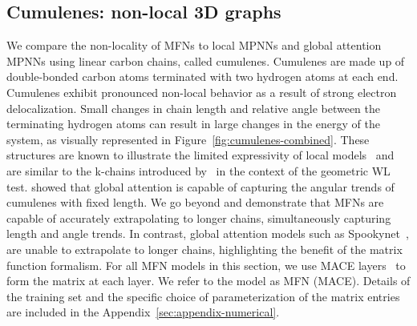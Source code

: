 \documentclass{article} \usepackage{iclr2024_conference,times}
\begin{document}
\subsection{Cumulenes: non-local 3D graphs}
\label{sec:cumulenes}
\vspace{-6pt}
We compare the non-locality of MFNs to local MPNNs and global attention MPNNs using linear carbon chains, called cumulenes. Cumulenes are made up of double-bonded carbon atoms terminated with two hydrogen atoms at each end. Cumulenes exhibit pronounced non-local behavior as a result of strong electron delocalization.  Small changes in chain length and relative angle between the terminating hydrogen atoms can result in large changes in the energy of the system, as visually represented in Figure~\ref{fig:cumulenes-combined}. These structures are known to illustrate the limited expressivity of local models~\citep{unke2021machine} and are similar to the k-chains introduced by~\cite{joshi2023expressive} in the context of the geometric WL test. \cite{frank2022so3krates} showed that global attention is capable of capturing the angular trends of cumulenes with fixed length. We go beyond and demonstrate that MFNs are capable of accurately extrapolating to longer chains, simultaneously capturing length and angle trends. In contrast, global attention models such as Spookynet~\citep{Unke2021}, are unable to extrapolate to longer chains, highlighting the benefit of the matrix function formalism.  For all MFN models in this section, we use MACE layers~\citep{Batatia2022mace} to form the matrix at each layer. We refer to the model as MFN (MACE). Details of the training set and the specific choice of parameterization of the matrix entries are included in the Appendix~\ref{sec:appendix-numerical}.
\end{document}
